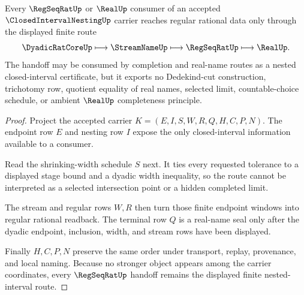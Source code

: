\begin{theorem}
\label{thm:closed-interval-nesting-regseqrat-handoff}
Every $\RegSeqRatUp$ or $\RealUp$ consumer of an accepted $\ClosedIntervalNestingUp$ carrier reaches regular rational data only through the displayed finite route
$$
\DyadicRatCoreUp
\longmapsto
\StreamNameUp
\longmapsto
\RegSeqRatUp
\longmapsto
\RealUp .
$$
The handoff may be consumed by completion and real-name routes as a nested closed-interval certificate, but it exports no Dedekind-cut construction, trichotomy row, quotient equality of real names, selected limit, countable-choice schedule, or ambient $\RealUp$ completeness principle.
\end{theorem}
\begin{proof}
Project the accepted carrier $K=(E,I,S,W,R,Q,H,C,P,N)$. The endpoint row $E$ and nesting row $I$ expose the only closed-interval information available to a consumer.

Read the shrinking-width schedule $S$ next. It ties every requested tolerance to a displayed stage bound and a dyadic width inequality, so the route cannot be interpreted as a selected intersection point or a hidden completed limit.

The stream and regular rows $W,R$ then turn those finite endpoint windows into regular rational readback. The terminal row $Q$ is a real-name seal only after the dyadic endpoint, inclusion, width, and stream rows have been displayed.

Finally $H,C,P,N$ preserve the same order under transport, replay, provenance, and local naming. Because no stronger object appears among the carrier coordinates, every $\RegSeqRatUp$ handoff remains the displayed finite nested-interval route.
\end{proof}




